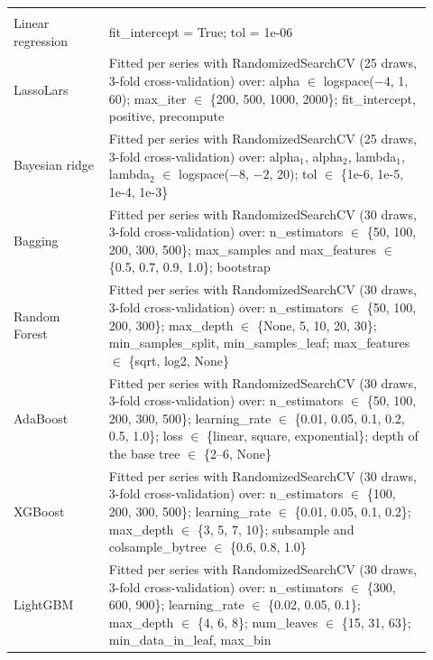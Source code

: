 \begin{longtable}{>{\raggedright\arraybackslash}p{0.21\linewidth}>{\raggedright\arraybackslash}p{0.71\linewidth}}
\addlinespace
\multicolumn{2}{l}{\textit{Machine learning}} \\[1mm]
\hspace{.6em}Linear regression & fit\_intercept = True; tol = 1e-06 \\
\hspace{.6em}LassoLars & Fitted per series with RandomizedSearchCV (25 draws, 3-fold cross-validation) over: alpha $\in$ logspace($-4$, 1, 60); max\_iter $\in$ \{200, 500, 1000, 2000\}; fit\_intercept, positive, precompute \\
\hspace{.6em}Bayesian ridge & Fitted per series with RandomizedSearchCV (25 draws, 3-fold cross-validation) over: alpha$_1$, alpha$_2$, lambda$_1$, lambda$_2$ $\in$ logspace($-8$, $-2$, 20); tol $\in$ \{1e-6, 1e-5, 1e-4, 1e-3\} \\
\hspace{.6em}Bagging & Fitted per series with RandomizedSearchCV (30 draws, 3-fold cross-validation) over: n\_estimators $\in$ \{50, 100, 200, 300, 500\}; max\_samples and max\_features $\in$ \{0.5, 0.7, 0.9, 1.0\}; bootstrap \\
\hspace{.6em}Random Forest & Fitted per series with RandomizedSearchCV (30 draws, 3-fold cross-validation) over: n\_estimators $\in$ \{50, 100, 200, 300\}; max\_depth $\in$ \{None, 5, 10, 20, 30\}; min\_samples\_split, min\_samples\_leaf; max\_features $\in$ \{sqrt, log2, None\} \\
\hspace{.6em}AdaBoost & Fitted per series with RandomizedSearchCV (30 draws, 3-fold cross-validation) over: n\_estimators $\in$ \{50, 100, 200, 300, 500\}; learning\_rate $\in$ \{0.01, 0.05, 0.1, 0.2, 0.5, 1.0\}; loss $\in$ \{linear, square, exponential\}; depth of the base tree $\in$ \{2--6, None\} \\
\hspace{.6em}XGBoost & Fitted per series with RandomizedSearchCV (30 draws, 3-fold cross-validation) over: n\_estimators $\in$ \{100, 200, 300, 500\}; learning\_rate $\in$ \{0.01, 0.05, 0.1, 0.2\}; max\_depth $\in$ \{3, 5, 7, 10\}; subsample and colsample\_bytree $\in$ \{0.6, 0.8, 1.0\} \\
\hspace{.6em}LightGBM & Fitted per series with RandomizedSearchCV (30 draws, 3-fold cross-validation) over: n\_estimators $\in$ \{300, 600, 900\}; learning\_rate $\in$ \{0.02, 0.05, 0.1\}; max\_depth $\in$ \{4, 6, 8\}; num\_leaves $\in$ \{15, 31, 63\}; min\_data\_in\_leaf, max\_bin \\

\end{longtable}
